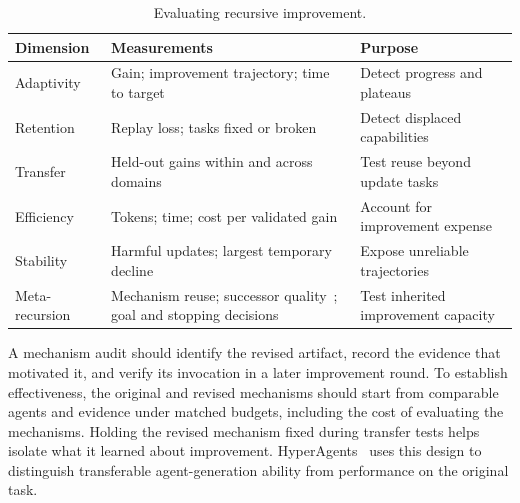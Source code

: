 \begin{table}[!t]
  \centering
  \caption{Evaluating recursive improvement.}
  \label{tab:l5-evaluation}
  \scriptsize
  \setlength{\tabcolsep}{3pt}
  \renewcommand{\arraystretch}{1.12}
  \renewcommand{\tabularxcolumn}[1]{m{#1}}
  \begin{tabularx}{\textwidth}{@{}>{\raggedright\arraybackslash}m{}>{\raggedright\arraybackslash}m{}>{\raggedright\arraybackslash}X@{}}
    \toprule
    \textbf{Dimension} & \textbf{Measurements} & \textbf{Purpose} \\
    \midrule
    Adaptivity & Gain; improvement trajectory; time to target~\cite{jiang2026sea,zheng2026seagym} & Detect progress and plateaus \\
    \addlinespace[2pt]
    Retention & Replay loss; tasks fixed or broken~\cite{zheng2026seagym} & Detect displaced capabilities \\
    \addlinespace[2pt]
    Transfer & Held-out gains within and across domains~\cite{zheng2026seagym} & Test reuse beyond update tasks \\
    \addlinespace[2pt]
    Efficiency & Tokens; time; cost per validated gain~\cite{jiang2026sea,zheng2026seagym} & Account for improvement expense \\
    \addlinespace[2pt]
    Stability & Harmful updates; largest temporary decline~\cite{jiang2026sea,zheng2026seagym} & Expose unreliable trajectories \\
    \addlinespace[2pt]
    Meta-recursion & Mechanism reuse; successor quality~\cite{zelikman2024stop,zhang2026hyperagents,iacob2026redqueen}; goal and stopping decisions & Test inherited improvement capacity \\
    \bottomrule
  \end{tabularx}
  \par{}
\end{table}

A mechanism audit should identify the revised artifact, record the evidence that motivated it, and verify its invocation in a later improvement round. To establish effectiveness, the original and revised mechanisms should start from comparable agents and evidence under matched budgets, including the cost of evaluating the mechanisms. Holding the revised mechanism fixed during transfer tests helps isolate what it learned about improvement. HyperAgents~\cite{zhang2026hyperagents} uses this design to distinguish transferable agent-generation ability from performance on the original task.

